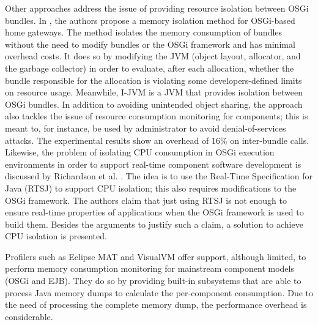 Other approaches address the issue of providing resource isolation between OSGi bundles.
In \cite{Kuroda2014}, the authors propose a memory isolation method for OSGi-based home gateways.
The method isolates the memory consumption of bundles without the need to modify bundles or the OSGi framework and has minimal overhead costs.
It does so by modifying the JVM (object layout, allocator, and the garbage collector) in order to evaluate, after each allocation, whether the bundle responsible for the allocation is violating some developers-defined limits on resource usage.
Meanwhile, I-JVM \cite{dsn/09/geoffray/ijvm} is a JVM that provides isolation between OSGi bundles.
In addition to avoiding unintended object sharing, the approach also tackles the issue of resource consumption monitoring for components; this is meant to, for instance, be used by administrator to avoid denial-of-services attacks.
The experimental results show an overhead of 16\% on inter-bundle calls.
Likewise, the problem of isolating CPU consumption in OSGi execution environments in order to support real-time component software development is discussed by Richardson et al. \cite{Richardson2009}.
The idea is to use the Real-Time Specification for Java (RTSJ) to support CPU isolation; this also requires modifications to the OSGi framework.
The authors claim that just using RTSJ is not enough to ensure real-time properties of applications when the OSGi framework is used to build them.
Besides the arguments to justify such a claim, a solution to achieve CPU isolation is presented.

Profilers such as Eclipse MAT and VisualVM offer support, although limited, to perform memory consumption monitoring for mainstream component models (OSGi and EJB).
They do so by providing built-in subsystems that are able to process Java memory dumps to calculate the per-component consumption.
Due to the need of processing the complete memory dump, the performance overhead is considerable. 



